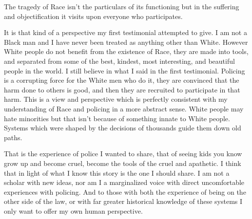 \documentclass{report}
\begin{document}
The tragedy of Race isn't the particulars of its functioning
but in the suffering and objectification it visits upon everyone
who participates. 

It is that kind of a perspective my first testimonial attempted
to give. I am not a Black man and I have never been treated as
anything other than White. However White people do not benefit
from the existence of Race, they are made into tools, and 
separated from some of the best, kindest, most interesting, and
beautiful people in the world. I still believe in
what I said in the first testimonial. Policing is a corrupting
force for the White men who do it, they are convinced that the
harm done to others is good, and then they are recruited to
participate in that harm. This is a view and perspective which
is perfectly consistent with my understanding of Race and policing
in a more abstract sense. White people may hate minorities but
that isn't because of something innate to White people. Systems
which were shaped by the decisions of thousands guide them down
old paths. 

That is the experience of police I wanted to share, that of seeing
kids you know grow up and become cruel, become the tools
of the cruel and apathetic. I think that in light of what I
know this story is the one I should share. I am not a scholar
with new ideas, nor am I a marginalized voice with direct
uncomfortable experiences with policing. And to those with
both the experience of being on the other side of the law,
or with far greater historical knowledge of these systems
I only want to offer my own human perspective.
\end{document}
